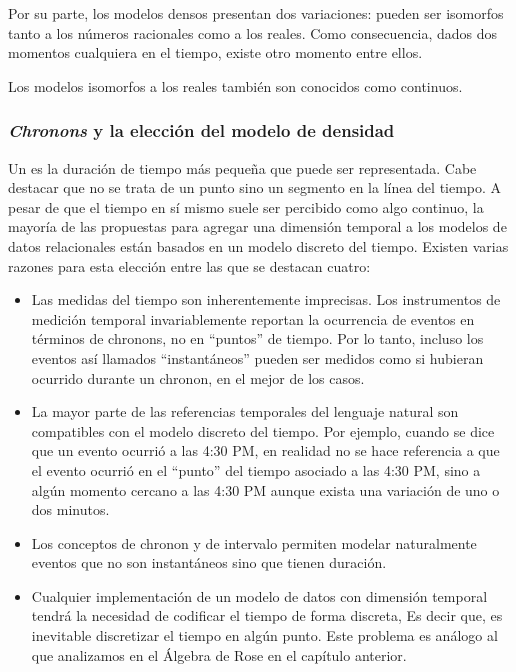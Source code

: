 Por su parte, los modelos densos presentan dos variaciones: pueden ser isomorfos tanto a los números racionales como a los reales.
Como consecuencia, dados dos momentos cualquiera en el tiempo, existe otro momento entre ellos.

Los modelos isomorfos a los reales también son conocidos como continuos.

\subsubsection{\textit{Chronons} y la elección del modelo de densidad}

Un  es la duración de tiempo más pequeña que puede ser representada.
Cabe destacar que no se trata de un punto sino un segmento en la línea del tiempo.
A pesar de que el tiempo en sí mismo suele ser percibido como algo continuo,
la mayoría de las propuestas para agregar una dimensión temporal a los modelos de datos relacionales están basados en un modelo discreto del tiempo.
Existen varias razones para esta elección entre las que se destacan cuatro:

\begin{itemize}
    \item Las medidas del tiempo son inherentemente imprecisas.
    Los instrumentos de medición temporal invariablemente reportan la ocurrencia de eventos en términos de chronons, no en “puntos” de tiempo.
    Por lo tanto, incluso los eventos así llamados “instantáneos” pueden ser medidos como si hubieran ocurrido durante un chronon, en el mejor de los casos.
    \item La mayor parte de las referencias temporales del lenguaje natural son compatibles con el modelo discreto del tiempo.
    Por ejemplo, cuando se dice que un evento ocurrió a las 4:30 PM,
    en realidad no se hace referencia a que el evento ocurrió en el “punto” del tiempo asociado a las 4:30 PM,
    sino a algún momento cercano a las 4:30 PM aunque exista una variación de uno o dos minutos.
    \item Los conceptos de chronon y de intervalo permiten modelar naturalmente eventos que no son instantáneos sino que tienen duración.
    \item Cualquier implementación de un modelo de datos con dimensión temporal tendrá la necesidad de codificar el tiempo de forma discreta,
    Es decir que, es inevitable discretizar el tiempo en algún punto.
    Este problema es análogo al que analizamos en el Álgebra de Rose en el capítulo anterior.
\end{itemize}


